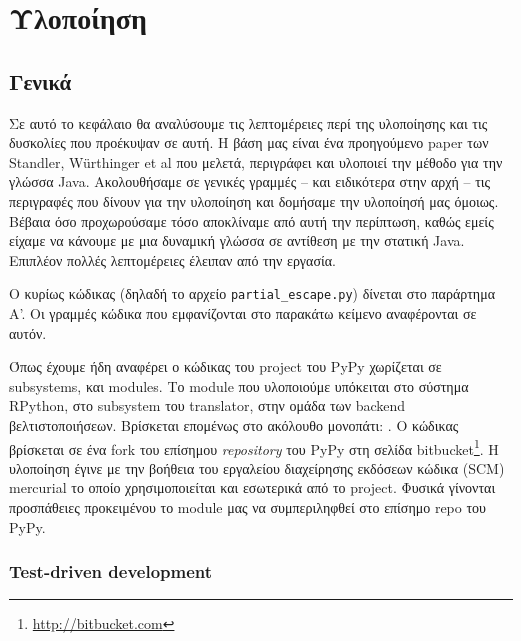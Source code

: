 
\chapter{Υλοποίηση}
\label{chapter4}

\section{Γενικά}

Σε αυτό το κεφάλαιο θα αναλύσουμε τις λεπτομέρειες περί της υλοποίησης και τις
δυσκολίες που προέκυψαν σε αυτή. Η βάση μας είναι ένα προηγούμενο paper των
Standler, W{\"u}rthinger et al\cite{stadler2014partial} που μελετά, περιγράφει
και υλοποιεί την μέθοδο για την γλώσσα Java. Ακολουθήσαμε σε γενικές γραμμές –
και ειδικότερα στην αρχή – τις περιγραφές που δίνουν για την υλοποίηση και
δομήσαμε την υλοποίησή μας όμοιως. Βέβαια όσο προχωρούσαμε τόσο αποκλίναμε από
αυτή την περίπτωση, καθώς εμείς είχαμε να κάνουμε με μια δυναμική γλώσσα σε
αντίθεση με την στατική Java. Επιπλέον πολλές λεπτομέρειες έλειπαν από την
εργασία.

Ο κυρίως κώδικας (δηλαδή το αρχείο \texttt{partial\_escape.py}) δίνεται στο
παράρτημα Α'. Οι γραμμές κώδικα που εμφανίζονται στο παρακάτω κείμενο
αναφέρονται σε αυτόν.

Όπως έχουμε ήδη αναφέρει ο κώδικας του project του PyPy χωρίζεται σε
subsystems, και modules. Το module που υλοποιούμε υπόκειται στο σύστημα
RPython, στο subsystem του translator, στην ομάδα των backend
βελτιστοποιήσεων. Βρίσκεται επομένως στο ακόλουθο μονοπάτι:
. Ο κώδικας
βρίσκεται σε ένα fork\cite{fork} του επίσημου \textit{repository} του
PyPy\cite{repo} στη σελίδα bitbucket\footnote{\url{http://bitbucket.com}}. Η
υλοποίηση έγινε με την βοήθεια του εργαλείου διαχείρησης εκδόσεων κώδικα (SCM)
mercurial\cite{mercurial} το οποίο χρησιμοποιείται και εσωτερικά από το
project. Φυσικά γίνονται προσπάθειες προκειμένου το module μας να
συμπεριληφθεί στο επίσημο repo του PyPy.


\subsection*{Test-driven development}

